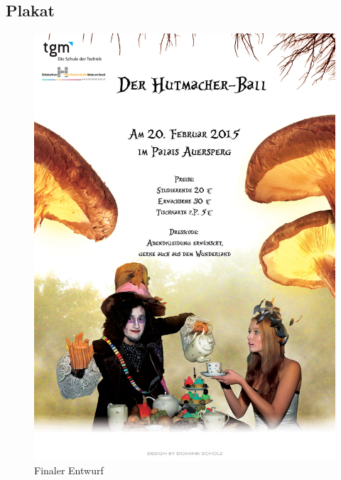 \documentclass[12pt]{article}
\begin{document}
\subsection{Plakat}
\begin{figure}[here!]
\centering
\begin{minipage}[h]{0.5\textwidth}
\centering
\includegraphics[width=1.0\textwidth]{versionbright_small}
    \caption{Finaler Entwurf}
    \label{fig:eai0}
\end{minipage}
\begin{minipage}[h]{0.45\textwidth}
\centering

\end{minipage}
\end{figure}
\end{document}
